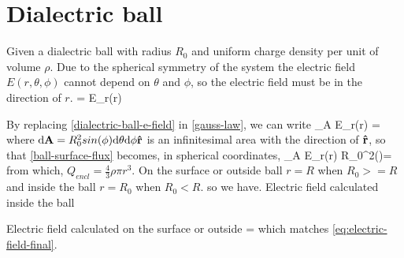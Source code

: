 \section{Dialectric ball}
Given a dialectric ball with radius $R_{0}$ and uniform charge density per unit of volume $\rho$. Due to
the spherical symmetry of the system the electric field $E(r,\theta,\phi)$ cannot depend on $\theta$
and $\phi$, so the electric field must be in the direction of $r$.
\be\label{dialectric-ball-e-field}
 = E_r(r) 
\ee

By replacing \ref{dialectric-ball-e-field} in \ref{gauss-law}, we can write
\be\label{ball-surface-flux}
\oiint_A E_r(r)  \cdot {} =
\ee
where $\mathrm{d}\mathbf{A}=R_{0}^2sin(\phi)\mathrm{d}\theta\mathrm{d}\phi\boldsymbol{\hat{\textbf{$\mathrm r$}}}$ is an infinitesimal 
area with the direction of $\boldsymbol{\hat{\textbf{$\mathrm r$}}}$, so that \ref{ball-surface-flux} becomes, in spherical coordinates,
\be\label{ball-surface-flux-2}
\oiint_A E_r(r) \cdot {}R_{0}^{2}\sin(\phi)\theta{}\phi =
\ee
from which, $Q_{encl}=\frac{4}{3}\rho\pi r^3$. On the surface or outside ball $r=R$ when $R_{0}>=R$  and inside the ball $r=R_0$ when $R_{0}<R$. so we have.
Electric field calculated inside the ball

Electric field calculated on the surface or outside
\be
{}=
\ee
which matches \ref{eq:electric-field-final}.
